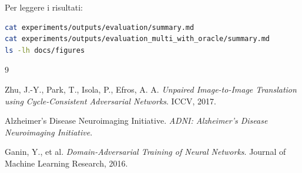 \documentclass[12pt,a4paper]{article}
\begin{document}
Per leggere i risultati:

\begin{lstlisting}[language=bash]
cat experiments/outputs/evaluation/summary.md
cat experiments/outputs/evaluation_multi_with_oracle/summary.md
ls -lh docs/figures
\end{lstlisting}


\begin{thebibliography}{9}

Zhu, J.-Y., Park, T., Isola, P., Efros, A. A.
\textit{Unpaired Image-to-Image Translation using Cycle-Consistent Adversarial Networks}.
ICCV, 2017.

Alzheimer's Disease Neuroimaging Initiative.
\textit{ADNI: Alzheimer's Disease Neuroimaging Initiative}.

Ganin, Y., et al.
\textit{Domain-Adversarial Training of Neural Networks}.
Journal of Machine Learning Research, 2016.

\end{thebibliography}
\end{document}
